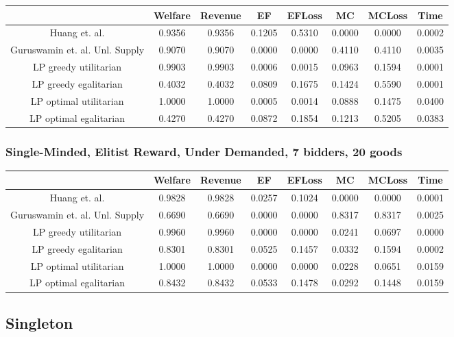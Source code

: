 \begin{tabular}{|c|c|c|c|c|c|c|c|}\hline
                            	&Welfare	&Revenue	&EF	&EFLoss	&MC	&MCLoss	&Time	\\\hline
                 Huang et. al.	&0.9356	&0.9356	&0.1205	&0.5310	&0.0000	&0.0000	&0.0002	\\\hline 
Guruswamin et. al. Unl. Supply	&0.9070	&0.9070	&0.0000	&0.0000	&0.4110	&0.4110	&0.0035	\\\hline 
         LP greedy utilitarian	&0.9903	&0.9903	&0.0006	&0.0015	&0.0963	&0.1594	&0.0001	\\\hline 
         LP greedy egalitarian	&0.4032	&0.4032	&0.0809	&0.1675	&0.1424	&0.5590	&0.0001	\\\hline 
        LP optimal utilitarian	&1.0000	&1.0000	&0.0005	&0.0014	&0.0888	&0.1475	&0.0400	\\\hline 
        LP optimal egalitarian	&0.4270	&0.4270	&0.0872	&0.1854	&0.1213	&0.5205	&0.0383	\\\hline 
\end{tabular}\subsubsection*{Single-Minded, Elitist Reward, Under Demanded, 7 bidders, 20 goods} 
\begin{tabular}{|c|c|c|c|c|c|c|c|}\hline
                            	&Welfare	&Revenue	&EF	&EFLoss	&MC	&MCLoss	&Time	\\\hline
                 Huang et. al.	&0.9828	&0.9828	&0.0257	&0.1024	&0.0000	&0.0000	&0.0001	\\\hline 
Guruswamin et. al. Unl. Supply	&0.6690	&0.6690	&0.0000	&0.0000	&0.8317	&0.8317	&0.0025	\\\hline 
         LP greedy utilitarian	&0.9960	&0.9960	&0.0000	&0.0000	&0.0241	&0.0697	&0.0000	\\\hline 
         LP greedy egalitarian	&0.8301	&0.8301	&0.0525	&0.1457	&0.0332	&0.1594	&0.0002	\\\hline 
        LP optimal utilitarian	&1.0000	&1.0000	&0.0000	&0.0000	&0.0228	&0.0651	&0.0159	\\\hline 
        LP optimal egalitarian	&0.8432	&0.8432	&0.0533	&0.1478	&0.0292	&0.1448	&0.0159	\\\hline 
\end{tabular}\newpage
\subsection{Singleton}
